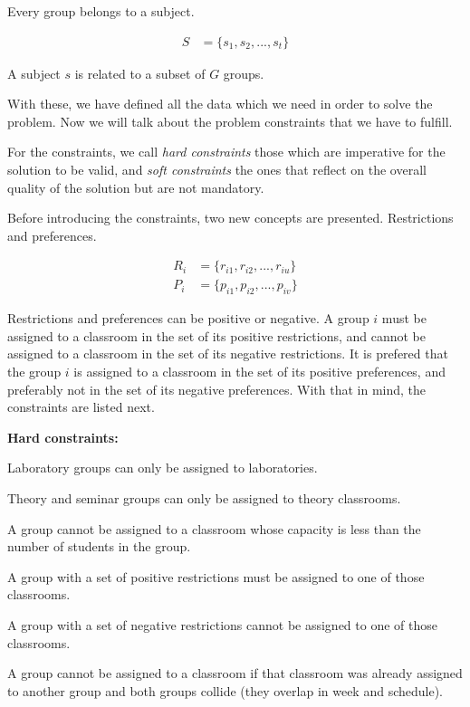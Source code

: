 Every group belongs to a subject.

\begin{align}
    S &= \{ s_{1}, s_{2}, ..., s_{t} \}
\end{align}

A subject $s$ is related to a subset of $G$ groups.

With these, we have defined all the data which we need in order to solve the problem. Now we will talk about the problem constraints that we have to fulfill.

For the constraints, we call \textit{hard constraints} those which are imperative for the solution to be valid, and \textit{soft constraints} the ones that reflect on the overall quality of the solution but are not mandatory.

Before introducing the constraints, two new concepts are presented. Restrictions and preferences.

\begin{align}
    R_{i} &= \{ r_{i1}, r_{i2}, ..., r_{iu} \}\\
    P_{i} &= \{ p_{i1}, p_{i2}, ..., p_{iv} \}
\end{align}

Restrictions and preferences can be positive or negative. A group $i$ must be assigned to a classroom in the set of its positive restrictions, and cannot be assigned to a classroom in the set of its negative restrictions. It is prefered that the group $i$ is assigned to a classroom in the set of its positive preferences, and preferably not in the set of its negative preferences. With that in mind, the constraints are listed next. 

\textbf{Hard constraints:}

\begin{description}
    \item Laboratory groups can only be assigned to laboratories.
    \item Theory and seminar groups can only be assigned to theory classrooms.
    \item A group cannot be assigned to a classroom whose capacity is less than the number of students in the group.
    \item A group with a set of positive restrictions must be assigned to one of those classrooms.
    \item A group with a set of negative restrictions cannot be assigned to one of those classrooms.
    \item A group cannot be assigned to a classroom if that classroom was already assigned to another group and both groups collide (they overlap in week and schedule).
\end{description}

